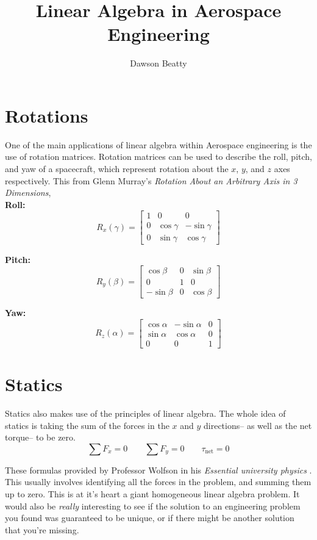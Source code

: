 \documentclass[10pt,letterpaper]{article}
\title{Linear Algebra in Aerospace Engineering}
\author{Dawson Beatty}
\begin{document}
	\maketitle
	\section*{Rotations}
	One of the main applications of linear algebra within Aerospace engineering is the use of rotation matrices.  Rotation matrices can be used to describe the roll, pitch, and yaw of a spacecraft, which represent rotation about the $x$, $y$, and $z$ axes respectively. This from Glenn Murray's \textit{Rotation About an Arbitrary Axis in 3 Dimensions}, \cite{Rotations}\\
	
	\textbf{Roll:}
	$$
	R_x(\gamma) = \begin{bmatrix}
	1 & 0 & 0 \\ 0 & \cos \gamma & -\sin \gamma \\ 0 & \sin \gamma & \cos \gamma 
	\end{bmatrix}
	$$
	
	\textbf{Pitch:}
	$$
	R_y( \beta ) = \begin{bmatrix}
	\cos \beta & 0 & \sin \beta \\ 0 & 1 & 0 \\ - \sin \beta & 0 & \cos \beta
	\end{bmatrix}
	$$
	
	\textbf{Yaw:}
	$$
	R_z( \alpha) = \begin{bmatrix}
	\cos \alpha & - \sin \alpha & 0 \\ \sin \alpha & \cos \alpha & 0 \\ 0 & 0 & 1
	\end{bmatrix}
	$$
	
	\section*{Statics}
	
	Statics also makes use of the principles of linear algebra.  The whole idea of statics is taking the sum of the forces in the $x$ and $y$ directions-- as well as the net torque-- to be zero. 
	$$
	\sum F_x = 0 \qquad \sum F_y = 0 \qquad \tau_{\text{net}} = 0
	$$ 
	
	These formulas provided by Professor Wolfson in his \textit{Essential university physics} \cite{Statics}.  This usually involves identifying all the forces in the problem, and summing them up to zero.  This is at it's heart a giant homogeneous linear algebra problem. It would also be \textit{really} interesting to see if the solution to an engineering problem you found was guaranteed to be unique, or if there might be another solution that you're missing. 
	
\end{document}
